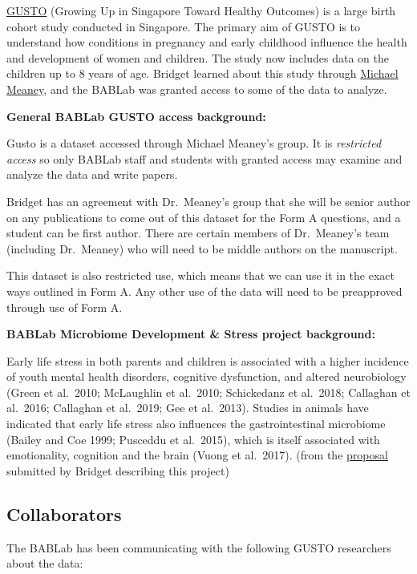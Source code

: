\documentclass[
]{book}
\begin{document}
\href{http://www.gusto.sg/}{GUSTO} (Growing Up in Singapore Toward Healthy Outcomes) is a large birth cohort study conducted in Singapore. The primary aim of GUSTO is to understand how conditions in pregnancy and early childhood influence the health and development of women and children. The study now includes data on the children up to 8 years of age. Bridget learned about this study through \href{https://douglas.research.mcgill.ca/michael-meaney}{Michael Meaney}, and the BABLab was granted access to some of the data to analyze.

\textbf{General BABLab GUSTO access background:}

Gusto is a dataset accessed through Michael Meaney's group. It is \emph{restricted access} so only BABLab staff and students with granted access may examine and analyze the data and write papers.

Bridget has an agreement with Dr.~Meaney's group that she will be senior author on any publications to come out of this dataset for the Form A questions, and a student can be first author. There are certain members of Dr.~Meaney's team (including Dr.~Meaney) who will need to be middle authors on the manuscript.

This dataset is also restricted use, which means that we can use it in the exact ways outlined in Form A. Any other use of the data will need to be preapproved through use of Form A.

\textbf{BABLab Microbiome Development \& Stress project background:}

Early life stress in both parents and children is associated with a higher incidence of youth mental health disorders, cognitive dysfunction, and altered neurobiology (Green et al.~2010; McLaughlin et al.~2010; Schickedanz et al.~2018; Callaghan et al.~2016; Callaghan et al.~2019; Gee et al.~2013). Studies in animals have indicated that early life stress also influences the gastrointestinal microbiome (Bailey and Coe 1999; Pusceddu et al.~2015), which is itself associated with emotionality, cognition and the brain (Vuong et al.~2017). (from the \href{https://ucla.app.box.com/file/740587024475}{proposal} submitted by Bridget describing this project)

\hypertarget{collaborators}{%
\subsection{Collaborators}\label{collaborators}}

The BABLab has been communicating with the following GUSTO researchers about the data:
\end{document}
